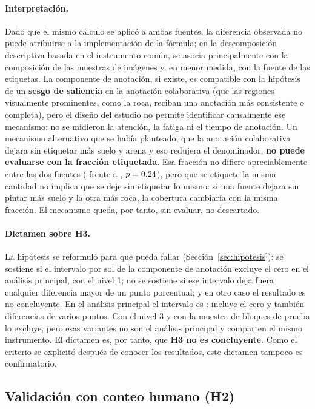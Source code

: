 \paragraph{Interpretación.} Dado que el mismo cálculo se aplicó a ambas fuentes, la diferencia
observada no puede atribuirse a la implementación de la fórmula; en la descomposición
descriptiva basada en el instrumento común, se asocia principalmente con la composición de las
muestras de imágenes y, en menor medida, con la fuente de las etiquetas. La componente de anotación, si existe, es compatible con la hipótesis de un
\textbf{sesgo de saliencia} en la anotación colaborativa (que las regiones visualmente
prominentes, como la roca, reciban una anotación más consistente o completa), pero el diseño
del estudio no permite identificar causalmente ese mecanismo: no se midieron la atención, la
fatiga ni el tiempo de anotación. Un mecanismo alternativo que se había planteado, que la
anotación colaborativa dejara sin etiquetar más suelo y arena y eso redujera el denominador,
\textbf{no puede evaluarse con la fracción etiquetada}. Esa fracción no difiere apreciablemente
entre las dos fuentes (\cFracValidMed{} frente a \cFracValidGold, $p = \num{0.24}$), pero que
se etiquete la misma cantidad no implica que se deje sin etiquetar lo mismo: si una fuente dejara
sin pintar más suelo y la otra más roca, la cobertura cambiaría con la misma fracción. El
mecanismo queda, por tanto, sin evaluar, no descartado.

\paragraph{Dictamen sobre H3.} La hipótesis se reformuló para que pueda fallar
(Sección~\ref{sec:hipotesis}): se sostiene si el intervalo por sol de la componente de anotación
excluye el cero en el análisis principal, con el nivel 1; no se sostiene si ese intervalo deja
fuera cualquier diferencia mayor de un punto porcentual; y en otro caso el resultado es no
concluyente. En el análisis principal el intervalo es \cTempAnotIC{}: incluye el cero y también
diferencias de varios puntos. Con el nivel 3 y con la muestra de bloques de prueba lo excluye,
pero esas variantes no son el análisis principal y comparten el mismo instrumento. El dictamen
es, por tanto, que \textbf{H3 no es concluyente}. Como el criterio se explicitó después de
conocer los resultados, este dictamen tampoco es confirmatorio.

\subsection{Validación con conteo humano (H2)}
\label{sec:validacion-manual}

